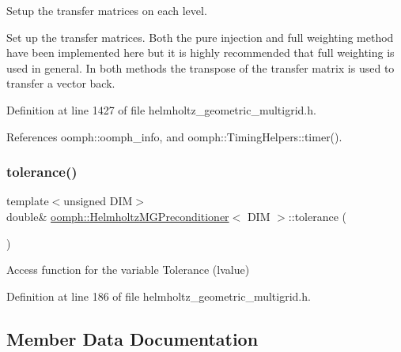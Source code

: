 Setup the transfer matrices on each level. 

Set up the transfer matrices. Both the pure injection and full weighting method have been implemented here but it is highly recommended that full weighting is used in general. In both methods the transpose of the transfer matrix is used to transfer a vector back. 

Definition at line 1427 of file helmholtz\+\_\+geometric\+\_\+multigrid.\+h.



References oomph\+::oomph\+\_\+info, and oomph\+::\+Timing\+Helpers\+::timer().

\mbox{\label{classoomph_1_1HelmholtzMGPreconditioner_ade139be8842bc33bc0ae37b64c8af65c}} 
\subsubsection{\texorpdfstring{tolerance()}{tolerance()}}
{\footnotesize\ttfamily template$<$unsigned D\+IM$>$ \\
double\& \hyperlink{classoomph_1_1HelmholtzMGPreconditioner}{oomph\+::\+Helmholtz\+M\+G\+Preconditioner}$<$ D\+IM $>$\+::tolerance (\begin{DoxyParamCaption}{ }\end{DoxyParamCaption})\hspace{0.3cm}{\ttfamily [inline]}}



Access function for the variable Tolerance (lvalue) 



Definition at line 186 of file helmholtz\+\_\+geometric\+\_\+multigrid.\+h.



\subsection{Member Data Documentation}
\mbox{\label{classoomph_1_1HelmholtzMGPreconditioner_a99ced707bfbb8f6d0428419675236879}} 
